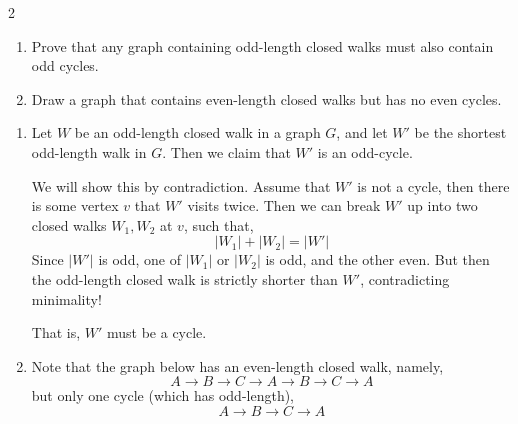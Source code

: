 \documentclass[12pt]{article}
\begin{document}
\newpage 

\begin{problem}{2}
    \begin{enumerate}
        \item [(a)] Prove that any graph containing odd-length closed walks must also contain odd cycles.
        \item[(b)] Draw a graph that contains even-length closed walks but has no even cycles.
    \end{enumerate}
\end{problem}


\begin{solution}
    \bbni
    \begin{enumerate}
        \item[(a)] Let $W$ be an odd-length closed walk in a graph $G$, and let $W'$ be the shortest odd-length walk in $G$. Then we claim that $W'$ is an odd-cycle. 
        
        We will show this by contradiction. Assume that $W'$ is not a cycle, then there is some vertex $v$ that $W'$ visits twice. Then we can break $W'$ up into two closed walks $W_1, W_2$ at $v$, such that, 
        \[|W_1| + |W_2| = |W'|\]
        Since $|W'|$ is odd, one of $|W_1|$ or $|W_2|$ is odd, and the other even. But then the odd-length closed walk is strictly shorter than $W'$, contradicting minimality!

        That is, $W'$ must be a cycle. 
        \item[(b)]   Note that the graph below has an even-length closed walk, namely, 
        \[A \rightarrow B \rightarrow C \rightarrow A \rightarrow B \rightarrow C \rightarrow A\]
        but only one cycle (which has odd-length), 
        \[A \rightarrow B \rightarrow C \rightarrow A\]
        \begin{center}
        \end{center}
    \end{enumerate}
\end{solution}
\end{document}
